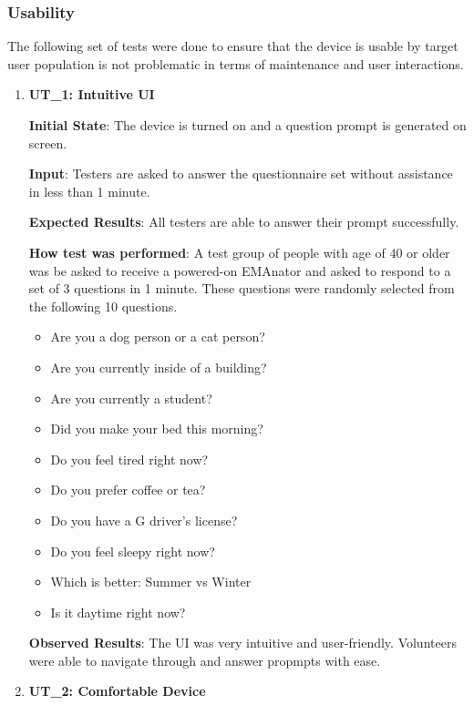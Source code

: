 \documentclass[12pt, titlepage]{article}
\begin{document}
\subsubsection{Usability}
The following set of tests were done to ensure that the device is usable by target user population is not problematic in terms of maintenance and user interactions.
\begin{enumerate}

  \item\textbf{{UT\_1: Intuitive UI\\}}\label{UT1}

  \textbf{Initial State}: The device is turned on and a question prompt is generated on screen.

  \textbf{Input}: Testers are asked to answer the questionnaire set without assistance in less than 1 minute.

  \textbf{Expected Results}: All testers are able to answer their prompt successfully.

  \textbf{How test was performed}: A test group of people with age of 40 or older was be asked to receive a powered-on EMAnator and asked to respond to a set of 3 questions in 1 minute. These questions were randomly selected from the following 10 questions.

  \begin{itemize}
    \item Are you a dog person or a cat person?
    \item Are you currently inside of a building?
    \item Are you currently a student?
    \item Did you make your bed this morning?
    \item Do you feel tired right now?
    \item Do you prefer coffee or tea?
    \item Do you have a G driver's license?
    \item Do you feel sleepy right now?
    \item Which is better: Summer vs Winter
    \item Is it daytime right now?
  \end{itemize}

  \textbf{Observed Results}: The UI was very intuitive and user-friendly. Volunteers were able to navigate through and answer propmpts with ease.

  \item\textbf{{UT\_2: Comfortable Device\\}}\label{UT2}


\end{enumerate}
\end{document}
